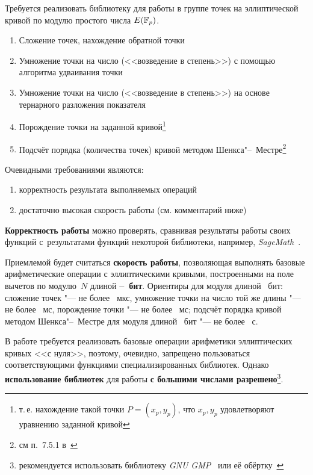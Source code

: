 \documentclass{ca-capstone}
\begin{document}


\goal
Требуется реализовать библиотеку для работы в группе точек на эллиптической кривой по модулю
простого числа $E(\mathbb{F}_{p})$.

\functionality
\begin{enumerate}
  \item Сложение точек, нахождение обратной точки
  \item Умножение точки на число (<<возведение в степень>>) с помощью алгоритма удваивания точки
  \item Умножение точки на число (<<возведение в степень>>) на основе тернарного разложения
    показателя
  \item Порождение точки на заданной кривой\footnote{т.\,е. нахождение такой точки
    $P = (x_p, y_p)$, что $x_p, y_p$ удовлетворяют уравнению заданной кривой}
  \item Подсчёт порядка (количества точек) кривой методом Шенкса"--~Местре\footnote{см
    п.~7.5.1 в~\cite{crandall-pomerance}}
\end{enumerate}

\requirements
Очевидными требованиями являются:
\begin{enumerate}
  \item корректность результата выполняемых операций
  \item достаточно высокая скорость работы (см. комментарий ниже)
\end{enumerate}

\textbf{Корректность работы} можно проверять, сравнивая результаты работы своих функций
с~результатами функций некоторой библиотеки, например, \emph{SageMath}~\cite{sagemath}.

Приемлемой будет считаться \textbf{скорость работы}, позволяющая выполнять базовые
арифметические операции с эллиптическими кривыми, построенными на поле вычетов по модулю~$N$
длиной \textbf{\ReqBitsMin--\ReqBitsMax~бит}. Ориентиры для модуля длиной \ReqBitsMax~бит:
сложение точек "--- не более \ReqAddUs~мкс, умножение точки на число той же длины "--- не более
\ReqMulMs~мс, порождение точки "--- не более \ReqPointMs~мс; подсчёт порядка кривой методом
Шенкса"--~Местре для модуля длиной \ReqOrderBits~бит "--- не более \ReqOrderSeconds~с.

\details
В работе требуется реализовать базовые операции арифметики эллиптических кривых <<с нуля>>,
поэтому, очевидно, запрещено пользоваться соответствующими функциями специализированных
библиотек. Однако \textbf{использование библиотек} для работы \textbf{с большими числами
разрешено}\footnote{рекомендуется использовать библиотеку \emph{GNU GMP}~\cite{gmp} или её
обёртку~\cite{gmpy2}}.
\end{document}

